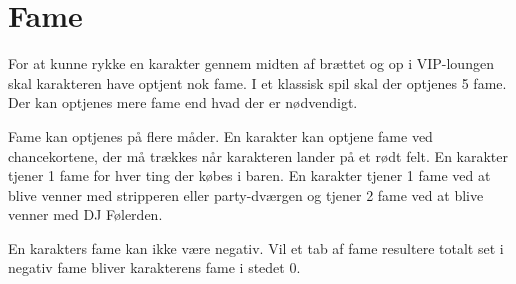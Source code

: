 \section{Fame}

For at kunne rykke en karakter gennem midten af brættet og op i VIP-loungen skal karakteren have optjent nok fame. I et klassisk spil skal der optjenes 5 fame. Der kan optjenes mere fame end hvad der er nødvendigt.

Fame kan optjenes på flere måder. En karakter kan optjene fame ved chancekortene, der må trækkes når karakteren lander på et rødt felt. En karakter tjener 1 fame for hver ting der købes i baren. En karakter tjener 1 fame ved at blive venner med stripperen eller party-dværgen og tjener 2 fame ved at blive venner med DJ Følerden.

En karakters fame kan ikke være negativ. Vil et tab af fame resultere totalt set i negativ fame bliver karakterens fame i stedet 0.